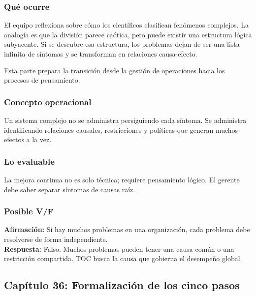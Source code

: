 \documentclass[
  11pt,
]{article}
\begin{document}
\hypertarget{quuxe9-ocurre-8}{%
\subsubsection{Qué ocurre}\label{quuxe9-ocurre-8}}

El equipo reflexiona sobre cómo los científicos clasifican fenómenos
complejos. La analogía es que la división parece caótica, pero puede
existir una estructura lógica subyacente. Si se descubre esa estructura,
los problemas dejan de ser una lista infinita de síntomas y se
transforman en relaciones causa-efecto.

Esta parte prepara la transición desde la gestión de operaciones hacia
los procesos de pensamiento.

\hypertarget{concepto-operacional-8}{%
\subsubsection{Concepto operacional}\label{concepto-operacional-8}}

Un sistema complejo no se administra persiguiendo cada síntoma. Se
administra identificando relaciones causales, restricciones y políticas
que generan muchos efectos a la vez.

\hypertarget{lo-evaluable-8}{%
\subsubsection{Lo evaluable}\label{lo-evaluable-8}}

La mejora continua no es solo técnica; requiere pensamiento lógico. El
gerente debe saber separar síntomas de causas raíz.

\hypertarget{posible-vf-8}{%
\subsubsection{Posible V/F}\label{posible-vf-8}}

\textbf{Afirmación:} Si hay muchos problemas en una organización, cada
problema debe resolverse de forma independiente.\\
\textbf{Respuesta:} Falso. Muchos problemas pueden tener una causa común
o una restricción compartida. TOC busca la causa que gobierna el
desempeño global.

\hypertarget{capuxedtulo-36-formalizaciuxf3n-de-los-cinco-pasos}{%
\subsection{Capítulo 36: Formalización de los cinco
pasos}\label{capuxedtulo-36-formalizaciuxf3n-de-los-cinco-pasos}}
\end{document}
